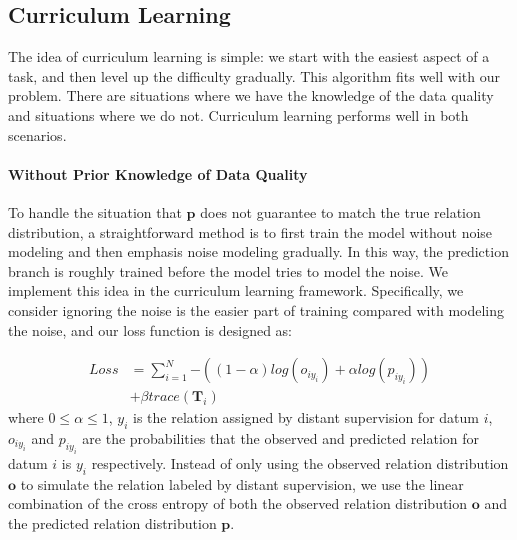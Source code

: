 \subsection{Curriculum Learning}
The idea of curriculum learning is simple: we start with the easiest aspect of a task, and then level up the difficulty gradually.
This algorithm fits well with our problem. 
There are situations where we have the knowledge of the data quality and situations where we do not. Curriculum learning performs
well in both scenarios.    


\paragraph{Without Prior Knowledge of Data Quality}
To handle the situation that $\mathbf{p}$ does not guarantee to match the true relation distribution, a straightforward method is to first train the model without noise modeling and then emphasis noise modeling gradually. In this way, the prediction branch is roughly trained before the model tries to model the noise. We implement this idea in the curriculum learning framework. Specifically, we consider ignoring the noise is the easier part of training compared with modeling the noise, and our loss function is designed as:


\begin{equation}
\begin{aligned}
Loss	&=\sum_{i=1}^N{-((1-\alpha) log(o_{iy_{i}}) + \alpha log(p_{iy_{i}}))} \\
&+ \beta trace(\mathbf{T}_{i})
\end{aligned}
\label{general_loss}
\end{equation}
where $0\le\alpha\le1$, $y_i$ is the relation assigned by distant supervision for datum $i$, $o_{iy_{i}}$ and $p_{iy_{i}}$ are the probabilities that the observed and predicted relation for datum $i$ is $y_i$ respectively. Instead of only using the observed relation distribution $\mathbf{o}$ to simulate the relation labeled by distant supervision, we use the linear combination of the cross entropy of both the observed relation distribution $\mathbf{o}$ and the predicted relation distribution $\mathbf{p}$.


